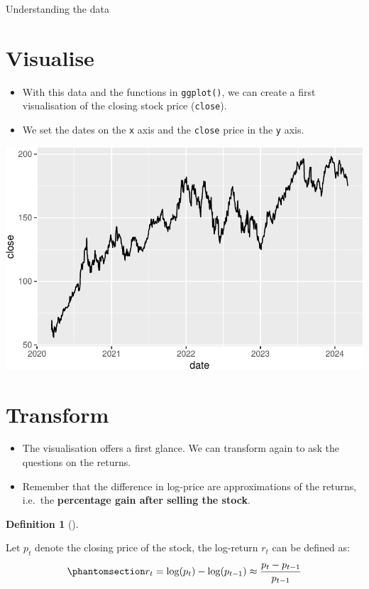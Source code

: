 \documentclass[
  12pt]{article}
\theoremstyle{definition}
\newtheorem{definition}{Definition}[section]
\theoremstyle{remark}
\begin{document}
Understanding the data

\section{Visualise}\label{visualise}

\begin{itemize}
\item
  With this data and the functions in \texttt{ggplot()}, we can create a
  first visualisation of the closing stock price (\texttt{close}).
\item
  We set the dates on the \texttt{x} axis and the \texttt{close} price
  in the \texttt{y} axis.
\end{itemize}

\includegraphics{jasa_files/figure-pdf/unnamed-chunk-6-1.pdf}

\section{Transform}\label{transform}

\begin{itemize}
\item
  The visualisation offers a first glance. We can transform again to ask
  the questions on the returns.
\item
  Remember that the difference in log-price are approximations of the
  returns, i.e.~the \textbf{percentage gain after selling the stock}.
\end{itemize}

\begin{definition}[]\protect\hypertarget{def-log-returns}{}\label{def-log-returns}

Let \(p_t\) denote the closing price of the stock, the log-return
\(r_t\) can be defined as:
\begin{equation}\phantomsection\label{eq-return-definition}{
r_t = \log(p_t) - \log(p_{t-1}) \approx \frac{p_t - p_{t-1}}{p_{t-1}}
}\end{equation}

\end{definition}
\end{document}
